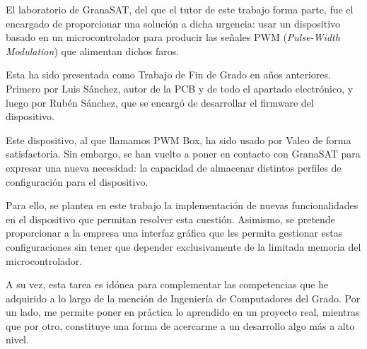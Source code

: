 El laboratorio de GranaSAT, del que el tutor de este trabajo forma parte, fue el encargado de proporcionar una solución a dicha urgencia: usar un dispositivo basado en un microcontrolador para producir las señales PWM (\textit{Pulse-Width Modulation}) que alimentan dichos faros.

Esta ha sido presentada como Trabajo de Fin de Grado en años anteriores. Primero por Luis Sánchez, autor de la PCB y de todo el apartado electrónico, y luego por Rubén Sánchez, que se encargó de desarrollar el firmware del dispositivo.

Este dispositivo, al que llamamos PWM Box, ha sido usado por Valeo de forma satisfactoria. Sin embargo, se han vuelto a poner en contacto con GranaSAT para expresar una nueva necesidad: la capacidad de almacenar distintos perfiles de configuración para el dispositivo.

Para ello, se plantea en este trabajo la implementación de nuevas funcionalidades en el dispositivo que permitan resolver esta cuestión. Asimismo, se pretende proporcionar a la empresa una interfaz gráfica que les permita gestionar estas configuraciones sin tener que depender exclusivamente de la limitada memoria del microcontrolador.

A su vez, esta tarea es idónea para complementar las competencias que he adquirido a lo largo de la mención de Ingeniería de Computadores del Grado. Por un lado, me permite poner en práctica lo aprendido en un proyecto real, mientras que por otro, constituye una forma de acercarme a un desarrollo algo más a alto nivel.

